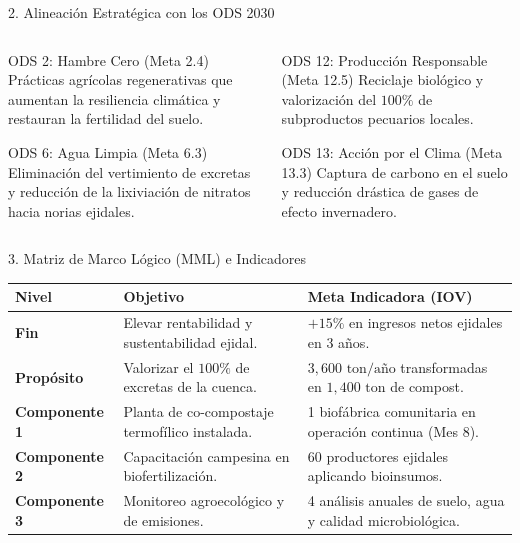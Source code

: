\documentclass[
  spanish,
  aspectratio=169,
  xcolor={dvipsnames,table}
]{beamer}
\begin{document}
\begin{frame}{2. Alineación Estratégica con los ODS 2030}
  \begin{columns}[T]
    \begin{column}{0.48\textwidth}
      \begin{block}{ODS 2: Hambre Cero (Meta 2.4)}
        Prácticas agrícolas regenerativas que aumentan la resiliencia climática y restauran la fertilidad del suelo.
      \end{block}
      \begin{block}{ODS 6: Agua Limpia (Meta 6.3)}
        Eliminación del vertimiento de excretas y reducción de la lixiviación de nitratos hacia norias ejidales.
      \end{block}
    \end{column}
    \begin{column}{0.48\textwidth}
      \begin{block}{ODS 12: Producción Responsable (Meta 12.5)}
        Reciclaje biológico y valorización del $100\%$ de subproductos pecuarios locales.
      \end{block}
      \begin{block}{ODS 13: Acción por el Clima (Meta 13.3)}
        Captura de carbono en el suelo y reducción drástica de gases de efecto invernadero.
      \end{block}
    \end{column}
  \end{columns}
\end{frame}

\begin{frame}{3. Matriz de Marco Lógico (MML) e Indicadores}
  \begin{table}[h!]
    \centering
    \footnotesize
    \begin{tabularx}{\textwidth}{lYY}
      \toprule
      \textbf{Nivel} & \textbf{Objetivo} & \textbf{Meta Indicadora (IOV)} \\
      \midrule
      \textbf{Fin} & Elevar rentabilidad y sustentabilidad ejidal. & $+15\%$ en ingresos netos ejidales en 3 años. \\
      \textbf{Propósito} & Valorizar el $100\%$ de excretas de la cuenca. & $3,600\text{ ton/año}$ transformadas en $1,400\text{ ton}$ de compost. \\
      \textbf{Componente 1} & Planta de co-compostaje termofílico instalada. & 1 biofábrica comunitaria en operación continua (Mes 8). \\
      \textbf{Componente 2} & Capacitación campesina en biofertilización. & 60 productores ejidales aplicando bioinsumos. \\
      \textbf{Componente 3} & Monitoreo agroecológico y de emisiones. & 4 análisis anuales de suelo, agua y calidad microbiológica. \\
      \bottomrule
    \end{tabularx}
  \end{table}
\end{frame}
\end{document}
